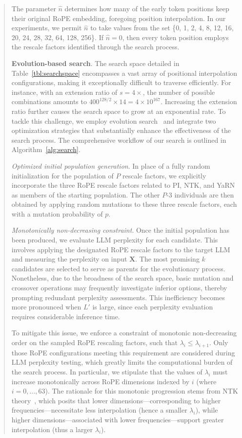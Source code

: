 \begin{abstract}
The parameter $\hat{n}$ determines how many of the early token positions keep their original RoPE embedding, foregoing position interpolation. In our experiments, we permit $\hat{n}$ to take values from the set \{0, 1, 2, 4, 8, 12, 16, 20, 24, 28, 32, 64, 128, 256\}. If $\hat{n}=0$, then every token position employs the rescale factors identified through the search process.

\textbf{Evolution-based search}. The search space detailed in Table~\ref{tbl:searchspace} encompasses a vast array of positional interpolation configurations, making it exceptionally difficult to traverse efficiently. For instance, with an extension ratio of $s=4\times$, the number of possible combinations amounts to $400^{128/2}\times14 = 4\times10^{167}$. Increasing the extension ratio further causes the search space to grow at an exponential rate. To tackle this challenge, we employ evolution search~\cite{guo2020single} and integrate two optimization strategies that substantially enhance the effectiveness of the search process. The comprehensive workflow of our search is outlined in Algorithm~\ref{alg:search}.

\textit{Optimized initial population generation}. In place of a fully random initialization for the population of $P$ rescale factors, we explicitly incorporate the three RoPE rescale factors related to PI, NTK, and YaRN as members of the starting population. The other $P$-3 individuals are then obtained by applying random mutations to these three rescale factors, each with a mutation probability of $p$.

\textit{Monotonically non-decreasing constraint}. Once the initial population has been produced, we evaluate LLM perplexity for each candidate. This involves applying the designated RoPE rescale factors to the target LLM and measuring the perplexity on input $\mathbf{X}$. The most promising $k$ candidates are selected to serve as parents for the evolutionary process. Nonetheless, due to the broadness of the search space, basic mutation and crossover operations may frequently investigate inferior options, thereby prompting redundant perplexity assessments. This inefficiency becomes more pronounced when $L'$ is large, since each perplexity evaluation requires considerable inference time.

To mitigate this issue, we enforce a constraint of monotonic non-decreasing order on the sampled RoPE rescaling factors, such that $\lambda_i \leq \lambda_{i+1}$. Only those RoPE configurations meeting this requirement are considered during LLM perplexity testing, which greatly limits the computational burden of the search process. In particular, we stipulate that the values of $\lambda_i$ must increase monotonically across RoPE dimensions indexed by $i$ (where $i=0,\ldots,63$). The rationale for this monotonic progression stems from NTK theory~\cite{jacot2018neural,tancik2020fourier,ntk}, which posits that lower dimensions—corresponding to higher frequencies—necessitate less interpolation (hence a smaller $\lambda_i$), while higher dimensions—associated with lower frequencies—support greater interpolation (thus a larger $\lambda_i$).


\end{abstract}
